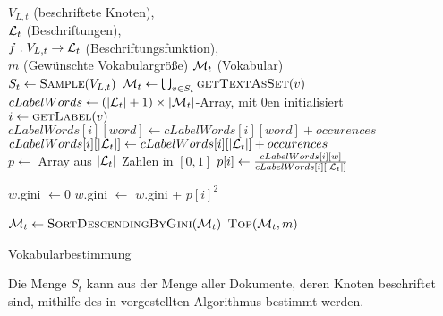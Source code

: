 \begin{algorithm}
    \begin{algorithmic}[1]
        \Require \\
                 $V_{L,t}$ (beschriftete Knoten),\\
                 $\mathcal{L}_t$ (Beschriftungen),\\
                 $f:V_{L,t} \rightarrow \mathcal{L}_t$ (Beschriftungsfunktion),\\
                 $m$ (Gewünschte Vokabulargröße)
        \Ensure  $\mathcal{M}_t$ (Vokabular)\\

        \State $S_t \gets \Call{Sample}{V_{L,t}}$ 
        \State $\M_t \gets \bigcup_{v \in S_t} \Call{getTextAsSet}{v}$ 
        \State $cLabelWords \gets (|\mathcal{L}_t|+1) \times |\mathcal{M}_t|$-Array, mit 0en initialisiert\\

         
            \State $i \gets \Call{getLabel}{v}$
                \State $cLabelWords[i][word] \gets cLabelWords[i][word] + occurences$
                \State $cLabelWords[i][|\mathcal{L}_t|] \gets cLabelWords[i][|\mathcal{L}_t|] + occurences$
            \EndFor
        \EndFor
        \\
            \State $p \gets $ Array aus $|\mathcal{L}_t|$ Zahlen in $[0, 1]$
                \State $p[i] \gets \frac{cLabelWords[i][w]}{cLabelWords[i][|\mathcal{L}_t|]}$
            \EndFor

            \State $w$.gini $\gets 0$
                \State $w$.gini $\gets$ $w$.gini + $p[i]^2$
            \EndFor
        \EndFor

        \State $\M_t \gets \Call{SortDescendingByGini}{\M_t}$
        \State \Return $\Call{Top}{\M_t, m}$
    \end{algorithmic}
\caption{Vokabularbestimmung}
\label{alg:vokabularbestimmung}
\end{algorithm}

Die Menge $S_t$ kann aus der Menge aller Dokumente, deren 
Knoten beschriftet sind, mithilfe des in \cite{Vitter} vorgestellten
Algorithmus bestimmt werden.

